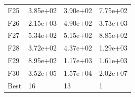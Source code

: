 \begin{table}[H]
\begin{minipage}{.5\linewidth}
\begin{tabular}{llll}
          F25  &  3.85e+02 &  3.90e+02 &  7.75e+02 \\
          F26  &  2.15e+03 &  4.90e+02 &  3.73e+03 \\
          F27  &  5.34e+02 &  5.15e+02 &  8.85e+02 \\
          F28  &  3.72e+02 &  4.37e+02 &  1.29e+03 \\
          F29  &  8.95e+02 &  1.17e+03 &  1.61e+03 \\
          F30  &  3.52e+05 &  1.57e+04 &  2.02e+07 \\
          Best &        16 &        13 &         1 \\
          \bottomrule
          \end{tabular}
          
    \end{minipage} 
\end{table}

